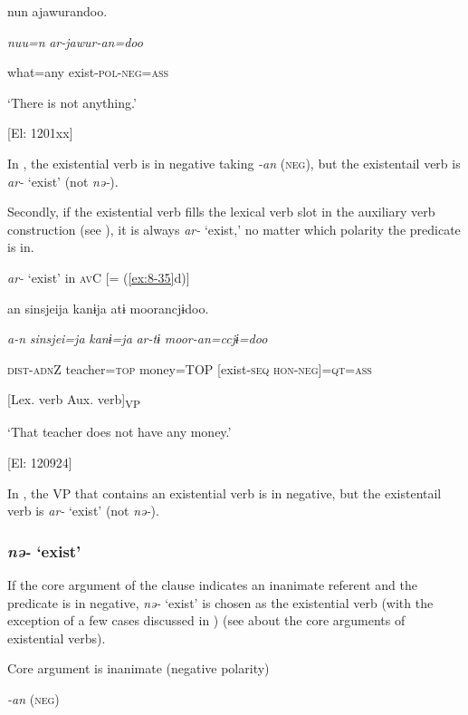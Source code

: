   {\TM}
\glll  nun  ajawurandoo.

    \textit{nuu=n}  \textit{ar-jawur-an=doo}

    what=any  exist-\textsc{pol}-\textsc{neg}=\textsc{ass}

    ‘There is not anything.’

    [El: 1201xx]

In , the existential verb is in negative taking \textit{{}-an} (\textsc{neg}), but the existentail verb is \textit{ar-} ‘exist’ (not \textit{nə-}).

  Secondly, if the existential verb fills the lexical verb slot in the auxiliary verb construction (see ), it is always \textit{ar-} ‘exist,’ no matter which polarity the predicate is in.

\textbf{\ea\label{ex:8-33}
}  \textit{ar-} ‘exist’ in \textsc{av}C [= (\ref{ex:8-35}d)]

  {\TM}
\glll  an  sinsjeija  kanɨja  atɨ  moorancjɨdoo.

    \textit{a-n}  \textit{sinsjei=ja}  \textit{kanɨ=ja}  \textit{ar-tɨ}  \textit{moor-an=ccjɨ=doo}

    \textsc{dist}-\textsc{adn}Z  teacher=\textsc{top}  money=TOP  [exist-\textsc{seq}  \textsc{hon}-\textsc{neg}]=\textsc{qt}=\textsc{ass}

          [Lex. verb  Aux. verb]\textsubscript{VP}

    ‘That teacher does not have any money.’

    [El: 120924]

In , the VP that contains an existential verb is in negative, but the existentail verb is \textit{ar-} ‘exist’ (not \textit{nə-}).

\subsubsection{\textit{nə-} ‘exist’}

If the core argument of the clause indicates an inanimate referent and the predicate is in negative, \textit{nə-} ‘exist’ is chosen as the existential verb (with the exception of a few cases discussed in ) (see  about the core arguments of existential verbs).

\textbf{\ea\label{ex:8-34}
}  Core argument is inanimate (negative polarity)

  \textit{{}-an} (\textsc{neg})


